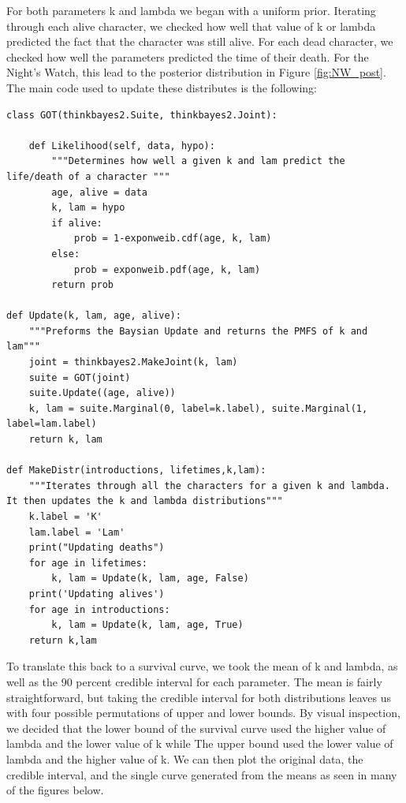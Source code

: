 \documentclass{article}
\begin{document}
For both parameters k and lambda we began with a uniform prior.  Iterating through each alive character, we checked how well that value of k or lambda predicted the fact that the character was still alive.  For each dead character, we checked how well the parameters predicted the time of their death.  For the Night's Watch, this lead to the posterior distribution in Figure \ref{fig:NW_post}. The main code used to update these distributes is the following:
\begin{lstlisting}
class GOT(thinkbayes2.Suite, thinkbayes2.Joint):

	def Likelihood(self, data, hypo):
		"""Determines how well a given k and lam predict the life/death of a character """
		age, alive = data
		k, lam = hypo
		if alive:
			prob = 1-exponweib.cdf(age, k, lam)
		else:
			prob = exponweib.pdf(age, k, lam)
		return prob

def Update(k, lam, age, alive):
	"""Preforms the Baysian Update and returns the PMFS of k and lam"""
	joint = thinkbayes2.MakeJoint(k, lam)
	suite = GOT(joint)
	suite.Update((age, alive))
	k, lam = suite.Marginal(0, label=k.label), suite.Marginal(1, label=lam.label)
	return k, lam

def MakeDistr(introductions, lifetimes,k,lam):
	"""Iterates through all the characters for a given k and lambda.  It then updates the k and lambda distributions"""
	k.label = 'K'
	lam.label = 'Lam'
	print("Updating deaths")
	for age in lifetimes:
		k, lam = Update(k, lam, age, False)
	print('Updating alives')
	for age in introductions:
		k, lam = Update(k, lam, age, True)
	return k,lam
\end{lstlisting}

To translate this back to a survival curve, we took the mean of k and lambda, as well as the 90 percent credible interval for each parameter.  The mean is fairly straightforward, but taking the credible interval for both distributions leaves us with four possible permutations of upper and lower bounds.  By visual inspection, we decided that the lower bound of the survival curve used the higher value of lambda and the lower value of k while The upper bound used the lower value of lambda and the higher value of k.  We can then plot the original data, the credible interval, and the single curve generated from the means as seen in many of the figures below.
\end{document}
